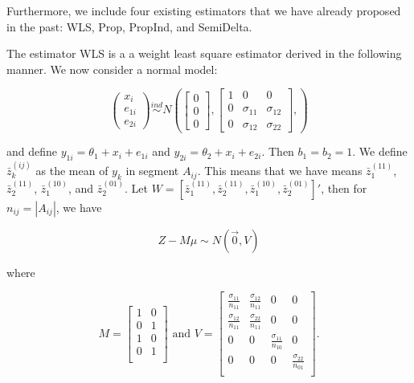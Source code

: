 \documentclass[
  letterpaper,
  DIV=11,
  numbers=noendperiod]{scrartcl}
\begin{document}
Furthermore, we include four existing estimators that we have already
proposed in the past: WLS, Prop, PropInd, and SemiDelta.

The estimator WLS is a a weight least square estimator derived in the
following manner. We now consider a normal model:

\[ 
  \begin{pmatrix}
    x_i \\ e_{1i} \\ e_{2i}
  \end{pmatrix} \stackrel{ind}{\sim}
  N \left(
  \begin{bmatrix}
    0 \\ 0 \\ 0
  \end{bmatrix},
  \begin{bmatrix}
    1 & 0 & 0 \\
    0 & \sigma_{11} & \sigma_{12} \\ 
    0 & \sigma_{12} & \sigma_{22}
  \end{bmatrix},
  \right)
\]

and define \(y_{1i} = \theta_1 + x_i + e_{1i}\) and
\(y_{2i} = \theta_2 + x_i + e_{2i}\). Then \(b_1 = b_2 = 1\). We define
\(\bar z_k^{(ij)}\) as the mean of \(y_k\) in segment \(A_{ij}\). This
means that we have means \(\bar z_1^{(11)}\), \(\bar z_2^{(11)}\),
\(\bar z_1^{(10)}\), and \(\bar z_2^{(01)}\). Let
\(W = [\bar z_1^{(11)}, \bar z_2^{(11)}, \bar z_1^{(10)}, \bar z_2^{(01)}]'\),
then for \(n_{ij} = |A_{ij}|\), we have

\[Z - M \mu \sim N(\vec 0, V)\]

where

\[M = 
  \begin{bmatrix}
    1 & 0 \\
    0 & 1 \\
    1 & 0 \\
    0 & 1 \\
  \end{bmatrix}
  \text{ and }
  V = 
  \begin{bmatrix}
    \frac{\sigma_{11}}{n_{11}} & \frac{\sigma_{12}}{n_{11}} & 0 & 0 \\
    \frac{\sigma_{12}}{n_{11}} & \frac{\sigma_{22}}{n_{11}} & 0 & 0 \\
    0 & 0 & \frac{\sigma_{11}}{n_{10}} & 0 \\
    0 & 0 & 0 & \frac{\sigma_{22}}{n_{01}} \\
  \end{bmatrix}.
\]
\end{document}
